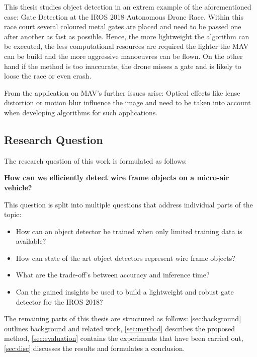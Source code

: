 This thesis studies object detection in an extrem example of the aforementioned case: Gate Detection at the IROS 2018 Autonomous Drone Race. Within this race court several coloured metal gates are placed and need to be passed one after another as fast as possible. Hence, the more lightweight the algorithm can be executed, the less computational resources are required the lighter the \ac{MAV} can be build and the more aggressive manoeuvres can be flown. On the other hand if the method is too inaccurate, the drone misses a gate and is likely to loose the race or even crash.

From the application on MAV's further issues arise: Optical effects like lense distortion or motion blur influence the image and need to be taken into account when developing algorithms for such applications. 

\subsection*{Research Question}

The research question of this work is formulated as follows:
\begin{center}
	\textbf{How can we efficiently detect wire frame objects on a micro-air vehicle?}
\end{center}


This question is split into multiple questions that address individual parts of the topic:

\begin{itemize}
	\item How can an object detector be trained when only limited training data is available?
	\item How can state of the art object detectors represent wire frame objects?
	\item What are the trade-off's between accuracy and inference time?
	\item Can the gained insights be used to build a lightweight and robust gate detector for the IROS 2018?
\end{itemize}

The remaining parts of this thesis are structured as follows: \autoref{sec:background} outlines background and related work, \autoref{sec:method} describes the proposed method, \autoref{sec:evaluation} contains the  experiments that have been carried out, \autoref{sec:disc} discusses the results and formulates a conclusion.

